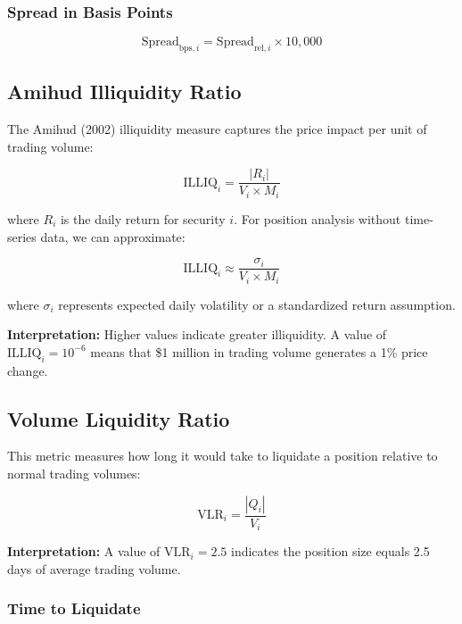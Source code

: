 \documentclass[11pt,a4paper]{article}
\begin{document}
\subsubsection{Spread in Basis Points}

\begin{equation}
\text{Spread}_{\text{bps},i} = \text{Spread}_{\text{rel},i} \times 10,000
\end{equation}

\subsection{Amihud Illiquidity Ratio}

The Amihud (2002) illiquidity measure captures the price impact per unit of trading volume:

\begin{equation}
\text{ILLIQ}_i = \frac{|R_i|}{V_i \times M_i}
\end{equation}

where $R_i$ is the daily return for security $i$. For position analysis without time-series data, we can approximate:

\begin{equation}
\text{ILLIQ}_i \approx \frac{\sigma_i}{V_i \times M_i}
\end{equation}

where $\sigma_i$ represents expected daily volatility or a standardized return assumption.

\textbf{Interpretation:} Higher values indicate greater illiquidity. A value of $\text{ILLIQ}_i = 10^{-6}$ means that \$1 million in trading volume generates a 1\% price change.

\subsection{Volume Liquidity Ratio}

This metric measures how long it would take to liquidate a position relative to normal trading volumes:

\begin{equation}
\text{VLR}_i = \frac{|Q_i|}{V_i}
\end{equation}

\textbf{Interpretation:} A value of $\text{VLR}_i = 2.5$ indicates the position size equals 2.5 days of average trading volume.

\subsubsection{Time to Liquidate}
\end{document}
